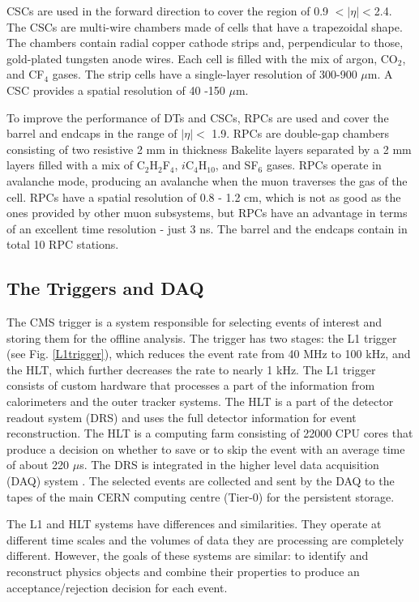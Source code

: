 \begin{normalsize}
CSCs are used in the forward direction to cover the region of 0.9 $ <|\eta|<$2.4. The CSCs are multi-wire chambers made of cells  that have a trapezoidal shape. The chambers contain radial copper cathode strips and, perpendicular to those, gold-plated tungsten anode wires. Each cell is filled with the mix of argon, CO$_2$, and CF$_4$ gases. The strip cells have a single-layer resolution of 300-900 $\mu$m. A CSC  provides a spatial resolution of 40 -150 $\mu$m.


To improve the performance of DTs and CSCs, RPCs are used and cover the barrel and endcaps in the range of $|\eta| <$ 1.9. 
RPCs are double-gap chambers consisting of two resistive 2 mm in thickness Bakelite layers separated by a 2 mm layers filled with a mix of C$_2$H$_2$F$_4$, $i$C$_4$H$_{10}$, and SF$_6$ gases. RPCs operate in avalanche mode, producing an avalanche when the muon traverses the gas of the cell. RPCs have a spatial resolution of 0.8 - 1.2 cm, which is not as good as the ones provided by other muon subsystems, but RPCs have an advantage in terms of an excellent time resolution - just 3 ns. The barrel and the endcaps contain in total 10 RPC stations.



\subsection{The Triggers and DAQ}

The CMS trigger \cite{Trigger} is a system responsible for selecting events of interest and storing them for the offline analysis. The trigger has two stages: the L1 trigger (see Fig. \ref{L1trigger}), which reduces the event rate from 40 MHz to 100 kHz, and the HLT, which further decreases the rate to nearly 1 kHz. The L1 trigger consists of custom hardware that processes a part of the information from calorimeters and the outer tracker systems. The HLT is a part of the detector readout system (DRS) and uses the full detector information for event reconstruction. The HLT is a computing farm consisting of 22000 CPU cores that produce a decision on whether to save or to skip the event with an average time of about 220 $\mu$s. The DRS is integrated in the higher level data acquisition (DAQ) system \cite{DAQ}. The selected events are collected and sent by the DAQ to the tapes of the main CERN computing centre (Tier-0) for the persistent storage. 

The L1 and HLT systems have differences and similarities. They operate at different time scales and the volumes of data they are processing are completely different. However, the goals of these systems are similar: to identify and reconstruct physics objects and combine their properties to produce an acceptance/rejection decision for each event. 



\end{normalsize}
